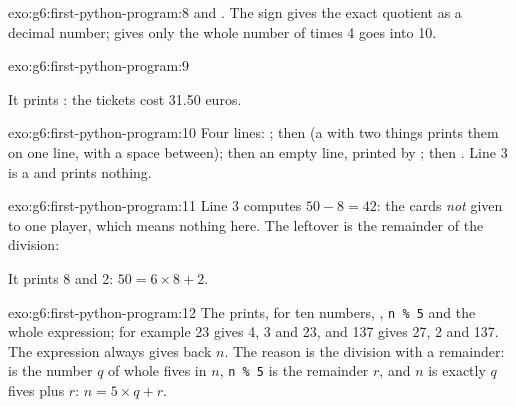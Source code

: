 \begin{solution}{exo:g6:first-python-program:8}
 and . The sign \code{/} gives the exact quotient as a
decimal number; \code{//} gives only the whole number of times 4 goes into 10.
\end{solution}

\begin{solution}{exo:g6:first-python-program:9}
\label{lst:g6:first-python-program:sol-tickets}

It prints : the tickets cost 31.50 euros.
\end{solution}

\begin{solution}{exo:g6:first-python-program:10}
Four lines: ; then  (a  with two things
prints them on one line, with a space between); then an empty line, printed by
; then . Line 3 is a  and prints nothing.
\end{solution}

\begin{solution}{exo:g6:first-python-program:11}
Line 3 computes $50 - 8 = 42$: the cards \emph{not} given to one player, which
means nothing here. The leftover is the remainder of the division:

\label{lst:g6:first-python-program:sol-cards}

It prints 8 and 2: $50 = 6 \times 8 + 2$.
\end{solution}

\begin{solution}{exo:g6:first-python-program:12}
The   prints, for ten numbers, ,
\texttt{n \% 5} and the whole expression; for example 23 gives 4, 3 and 23,
and 137 gives 27, 2 and 137. The expression always gives back $n$. The reason is
the division with a remainder:  is the number $q$ of whole fives in
$n$, \texttt{n \% 5} is the remainder $r$, and $n$ is exactly $q$ fives plus
$r$: $n = 5 \times q + r$.
\end{solution}

